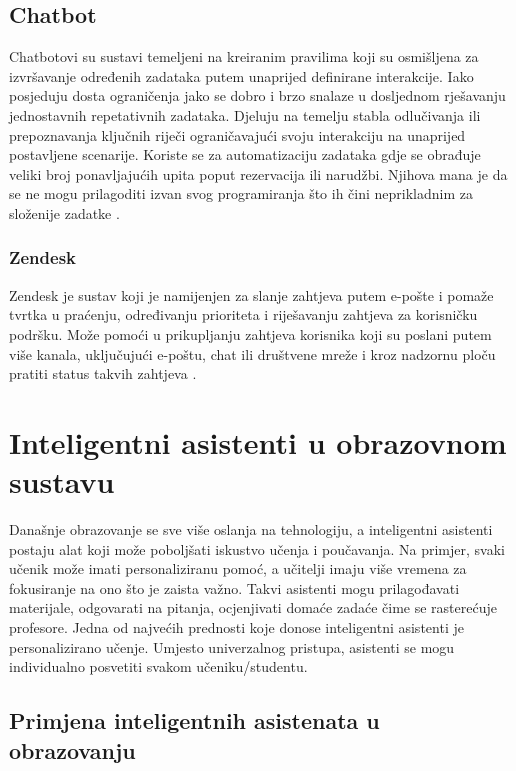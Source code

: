 \documentclass[]{foi}
\begin{document}
\subsection{Chatbot}

Chatbotovi su sustavi temeljeni na kreiranim pravilima koji su osmišljena za izvršavanje određenih zadataka putem unaprijed definirane interakcije. Iako posjeduju dosta ograničenja jako se dobro
i brzo snalaze u dosljednom rješavanju jednostavnih repetativnih zadataka. Djeluju na temelju stabla odlučivanja ili prepoznavanja ključnih riječi ograničavajući svoju interakciju na unaprijed 
postavljene scenarije. Koriste se za automatizaciju zadataka gdje se obrađuje veliki broj ponavljajućih upita poput rezervacija ili narudžbi. Njihova mana je da se ne mogu prilagoditi izvan
svog programiranja što ih čini neprikladnim za složenije zadatke \cite{exomindset2025difference}.

\subsubsection{Zendesk}

Zendesk je sustav koji je namijenjen za slanje zahtjeva putem e-pošte i pomaže tvrtka u praćenju, određivanju prioriteta i riješavanju zahtjeva za korisničku podršku.
Može pomoći u prikupljanju zahtjeva korisnika koji su poslani putem više kanala, uključujući e-poštu, chat ili društvene mreže i kroz nadzornu ploču pratiti status takvih zahtjeva \cite{zendesk_ai_2025}.

\newpage
\section{Inteligentni asistenti u obrazovnom sustavu}

Današnje obrazovanje se sve više oslanja na tehnologiju, a inteligentni asistenti postaju alat koji može poboljšati iskustvo učenja i poučavanja. Na primjer, svaki učenik može imati
personaliziranu pomoć, a učitelji imaju više vremena za fokusiranje na ono što je zaista važno. Takvi asistenti mogu prilagođavati materijale, odgovarati na pitanja, ocjenjivati domaće zadaće
čime se rasterećuje profesore. Jedna od najvećih prednosti koje donose inteligentni asistenti je personalizirano učenje. Umjesto univerzalnog pristupa, asistenti se mogu individualno 
posvetiti svakom učeniku/studentu. 

\subsection{Primjena inteligentnih asistenata u obrazovanju}
\end{document}
